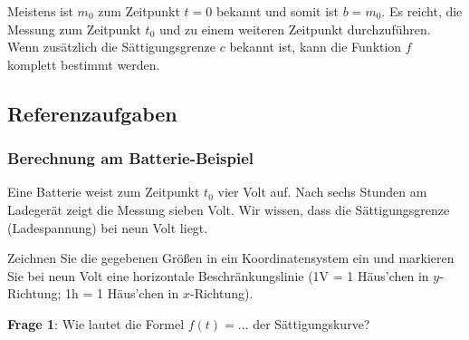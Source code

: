 \begin{bemerkung}{}{}
Meistens ist $m_0$ zum Zeitpunkt $t=0$ bekannt und somit ist $b=m_0$. Es reicht, die Messung zum Zeitpunkt $t_0$ und zu einem weiteren Zeitpunkt durchzuführen. Wenn zusätzlich die Sättigungsgrenze $c$ bekannt ist, kann die Funktion $f$ komplett bestimmt werden.
\end{bemerkung} 

\newpage

\subsection{Referenzaufgaben}

\subsubsection{Berechnung am Batterie-Beispiel}
Eine Batterie weist zum Zeitpunkt $t_0$ vier Volt auf. Nach sechs Stunden am Ladegerät zeigt die Messung sieben Volt. Wir wissen, dass die Sättigungsgrenze (Ladespannung) bei neun Volt liegt.

Zeichnen Sie die gegebenen Größen in ein Koordinatensystem ein und markieren Sie bei neun Volt eine horizontale Beschränkungslinie (\zB 1V = 1 Häus'chen in $y$-Richtung; 1h = 1 Häus'chen in $x$-Richtung).


\textbf{Frage 1}: Wie lautet die Formel $f(t) = ...$ der Sättigungskurve?








